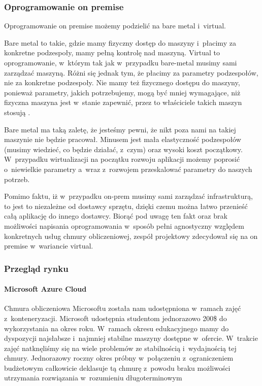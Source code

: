 \subsubsection{Oprogramowanie on premise}
Oprogramowanie on premise możemy podzielić na bare metal i~virtual.

Bare metal to takie, gdzie mamy fizyczny dostęp do maszyny i~płacimy za konkretne podzespoły, mamy pełną kontrolę nad maszyną.
Virtual to oprogramowanie, w~którym tak jak w~przypadku bare-metal musimy sami zarządzać maszyną.
Różni się jednak tym, że płacimy za parametry podzespołów, nie za konkretne podzespoły.
Nie mamy też fizycznego dostępu do maszyny, ponieważ parametry, jakich potrzebujemy, mogą być mniej wymagające, niż fizyczna maszyna jest w~stanie zapewnić, przez to właściciele takich maszyn stosują .

Bare metal ma taką zaletę, że jesteśmy pewni, że nikt poza nami na takiej maszynie nie będzie pracował.
Minusem jest mała elastyczność podzespołów (musimy wiedzieć, co będzie działać, z~czym) oraz wysoki koszt początkowy.
W~przypadku wirtualizacji na początku rozwoju aplikacji możemy poprosić o~niewielkie parametry a~wraz z~rozwojem przeskalować parametry do naszych potrzeb.

Pomimo faktu, iż w~przypadku \gls{on-prem} musimy sami zarządzać infrastrukturą, to jest to niezależne od dostawcy sprzętu, dzięki czemu można łatwo przenieść całą aplikację do innego dostawcy.
Biorąć pod uwagę ten fakt oraz brak możliwości napisania oprogramowania w~sposób pełni agnostyczny względem konkretnych usług chmury obliczeniowej, zespół projektowy zdecydował się na on premise w~wariancie virtual.

\subsubsection{Przegląd rynku}
\paragraph{Microsoft Azure Cloud}
Chmura obliczeniowa Microsoftu została nam udostępniona w~ramach zajęć z~konteneryzacji.
Microsoft udostępnia studentom jednorazowo 200\$ do wykorzystania na okres roku.
W~ramach okresu edukacyjnego mamy do dyspozycji najsłabsze i~najmniej stabilne maszyny dostępne w~ofercie.
W~trakcie zajęć natknęliśmy się na wiele problemów ze stabilnością i~wydajnością tej chmury.
Jednorazowy roczny okres próbny w~połączeniu z~ograniczeniem budżetowym całkowicie deklasuje tą chmurę z~powodu braku możliwości utrzymania rozwiązania w~rozumieniu długoterminowym


